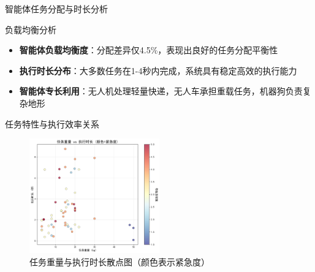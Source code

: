 \documentclass[
10pt,
aspectratio=169,
]{beamer}
\begin{document}
\begin{frame}{智能体任务分配与时长分析}
    \begin{exampleblock}{负载均衡分析}
        \begin{itemize}
            \item \textbf{智能体负载均衡度}：分配差异仅4.5\%，表现出良好的任务分配平衡性
            \item \textbf{执行时长分布}：大多数任务在1-4秒内完成，系统具有稳定高效的执行能力
            \item \textbf{智能体专长利用}：无人机处理轻量快递，无人车承担重载任务，机器狗负责复杂地形
        \end{itemize}
    \end{exampleblock}
\end{frame}

\begin{frame}{任务特性与执行效率关系}
    \begin{figure}
        \centering
        \includegraphics[width=0.5\textwidth]{analysis_results/weight_duration_scatter_20250617_081450.png}
        \caption{任务重量与执行时长散点图（颜色表示紧急度）}
    \end{figure}
    
\end{frame}
\end{document}

